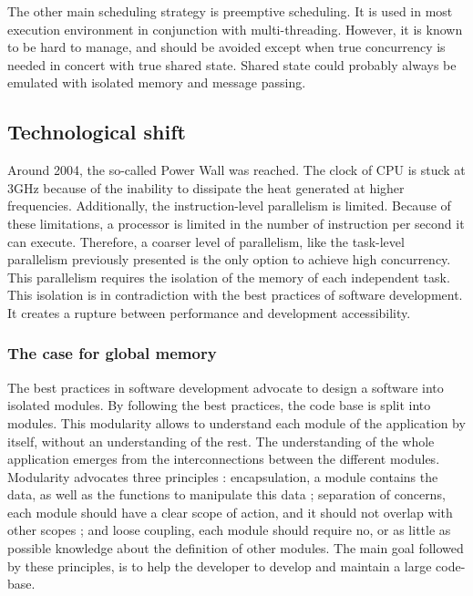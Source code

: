The other main scheduling strategy is preemptive scheduling.
It is used in most execution environment in conjunction with multi-threading.
However, it is known to be hard to manage, and should be avoided except when true concurrency is needed in concert with true shared state.
Shared state could probably always be emulated with isolated memory and message passing.

\subsection{Technological shift}


Around 2004, the so-called Power Wall was reached.
The clock of CPU is stuck at 3GHz because of the inability to dissipate the heat generated at higher frequencies.
Additionally, the instruction-level parallelism is limited.
Because of these limitations, a processor is limited in the number of instruction per second it can execute.
Therefore, a coarser level of parallelism, like the task-level parallelism previously presented is the only option to achieve high concurrency.
This parallelism requires the isolation of the memory of each independent task.
This isolation is in contradiction with the best practices of software development.
It creates a rupture between performance and development accessibility.

\subsubsection{The case for global memory}

The best practices in software development advocate to design a software into isolated modules.
By following the best practices, the code base is split into modules.
This modularity allows to understand each module of the application by itself, without an understanding of the rest.
The understanding of the whole application emerges from the interconnections between the different modules.
Modularity advocates three principles : encapsulation, a module contains the data, as well as the functions to manipulate this data ; separation of concerns, each module should have a clear scope of action, and it should not overlap with other scopes ; and loose coupling, each module should require no, or as little as possible knowledge about the definition of other modules.
The main goal followed by these principles, is to help the developer to develop and maintain a large code-base.


